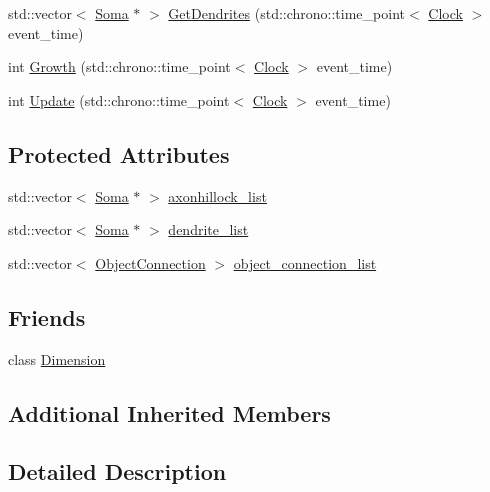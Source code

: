\begin{DoxyCompactItemize}
\item 
std\+::vector$<$ \hyperlink{class_soma}{Soma} $\ast$ $>$ \hyperlink{class_soma_afdb0e40855f31f2d9a48f3b13c01b599}{Get\+Dendrites} (std\+::chrono\+::time\+\_\+point$<$ \hyperlink{universe_8h_a0ef8d951d1ca5ab3cfaf7ab4c7a6fd80}{Clock} $>$ event\+\_\+time)
\item 
int \hyperlink{class_soma_aa6162ca8a98a14cf49ba8310db129d47}{Growth} (std\+::chrono\+::time\+\_\+point$<$ \hyperlink{universe_8h_a0ef8d951d1ca5ab3cfaf7ab4c7a6fd80}{Clock} $>$ event\+\_\+time)
\item 
int \hyperlink{class_soma_a211587ef21a7932c2f8f0345b1d32f57}{Update} (std\+::chrono\+::time\+\_\+point$<$ \hyperlink{universe_8h_a0ef8d951d1ca5ab3cfaf7ab4c7a6fd80}{Clock} $>$ event\+\_\+time)
\end{DoxyCompactItemize}
\subsection*{Protected Attributes}
\begin{DoxyCompactItemize}
\item 
std\+::vector$<$ \hyperlink{class_soma}{Soma} $\ast$ $>$ \hyperlink{class_soma_af93902336cddb974b282aef8b7b4243c}{axonhillock\+\_\+list}
\item 
std\+::vector$<$ \hyperlink{class_soma}{Soma} $\ast$ $>$ \hyperlink{class_soma_ab2d13b0adf2d10c242df0b8e62bcc01a}{dendrite\+\_\+list}
\item 
std\+::vector$<$ \hyperlink{struct_soma_1_1_object_connection}{Object\+Connection} $>$ \hyperlink{class_soma_a84739acd533862b115bd5cbe56da6c98}{object\+\_\+connection\+\_\+list}
\end{DoxyCompactItemize}
\subsection*{Friends}
\begin{DoxyCompactItemize}
\item 
class \hyperlink{class_soma_aabae1fdc220bf040d4f5c2c057abfcf5}{Dimension}
\end{DoxyCompactItemize}
\subsection*{Additional Inherited Members}


\subsection{Detailed Description}


